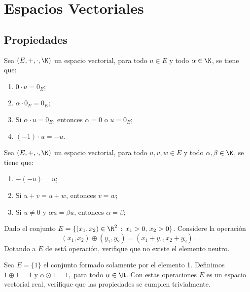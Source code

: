 \documentclass[compacto,10pt]{pubciencias-notas}
\begin{document}
\encabezado

\vspace*{-8mm}

\setcounter{section}{3}
\section{Espacios Vectoriales}
\setcounter{subsection}{1}
\subsection{Propiedades}

\begin{teo}
Sea $(E,+,\cdot,\K)$ un espacio vectorial, para todo $u \in E$ y todo $\alpha \in \K$, se tiene que:
\begin{enumerate}
\item $0\cdot u = 0_{E}$;
\item $\alpha \cdot 0_{E} = 0_{E}$;
\item Si $\alpha \cdot u=0_{E}$, entonces $\alpha  = 0$ o $u = 0_{E}$;
\item $(-1) \cdot u = -u$.
\end{enumerate}
\end{teo}

\begin{prop}
Sea $(E,+,\cdot,\K)$ un espacio vectorial, para todo $u, v, w \in E$ y todo $\alpha, \beta \in \K$, se tiene que:
    \begin{enumerate}
        \item $-(-u) = u$;
        \item Si $u + v = u + w$, entonces $v = w$;
        \item Si $u \neq 0$ y $\alpha u = \beta u$, entonces $\alpha  = \beta$;
    \end{enumerate}
\end{prop}

\begin{ejer}\hspace{0pt} Dado el conjunto $E = \{(x_{1},x_{2})\in\R^{2}\,:\,x_{1}>0,\,x_{2}>0\}$. Considere la operación
\[
    (x_{1},x_{2}) \oplus (y_{1},y_{2}) = (x_{1}+y_{1},x_{2}+y_{2}).
\]
Dotando a $E$ de está operación, verifique que no existe el elemento neutro.
\end{ejer}

\begin{ejem}\hspace{0pt} Sea $E=\{1\}$ el conjunto formado solamente por el elemento 1. Definimos $1 \oplus 1 = 1$ y $\alpha \odot 1 = 1,$ para todo $\alpha\in\R$. Con estas operaciones $E$ es un espacio vectorial real, verifique que las propiedades se cumplen trivialmente.
\end{ejem}
\end{document}
